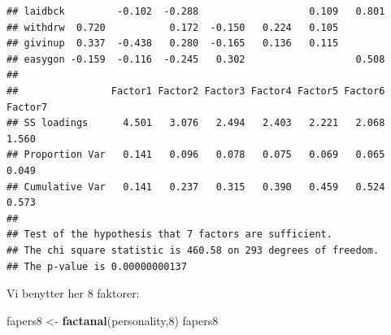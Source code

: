 \documentclass[]{book}
\newenvironment{Shaded}{\begin{snugshade}}{\end{snugshade}}
\newcommand{\DecValTok}[1]{\textcolor[rgb]{0.00,0.00,0.81}{#1}}
\newcommand{\KeywordTok}[1]{\textcolor[rgb]{0.13,0.29,0.53}{\textbf{#1}}}
\newcommand{\NormalTok}[1]{#1}
\newcommand{\StringTok}[1]{\textcolor[rgb]{0.31,0.60,0.02}{#1}}
\begin{document}
\begin{verbatim}
## laidbck         -0.102  -0.288                   0.109   0.801 
## withdrw  0.720           0.172  -0.150   0.224   0.105         
## givinup  0.337  -0.438   0.280  -0.165   0.136   0.115         
## easygon -0.159  -0.116  -0.245   0.302                   0.508 
## 
##                Factor1 Factor2 Factor3 Factor4 Factor5 Factor6 Factor7
## SS loadings      4.501   3.076   2.494   2.403   2.221   2.068   1.560
## Proportion Var   0.141   0.096   0.078   0.075   0.069   0.065   0.049
## Cumulative Var   0.141   0.237   0.315   0.390   0.459   0.524   0.573
## 
## Test of the hypothesis that 7 factors are sufficient.
## The chi square statistic is 460.58 on 293 degrees of freedom.
## The p-value is 0.00000000137
\end{verbatim}

Vi benytter her 8 faktorer:

\begin{Shaded}
\begin{Highlighting}[]
\NormalTok{fapers8 <-}\StringTok{ }\KeywordTok{factanal}\NormalTok{(personality,}\DecValTok{8}\NormalTok{)}
\NormalTok{fapers8}
\end{Highlighting}
\end{Shaded}
\end{document}
